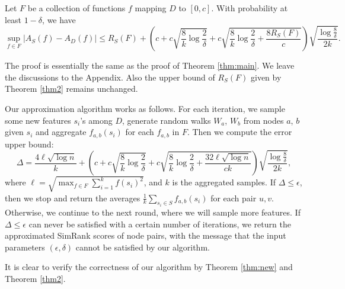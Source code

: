 \documentclass{article}
\begin{document}
\begin{theorem}
\label{thm:new}
Let $F$ be a collection of functions $f$ mapping $D$ to $[0,c]$. 
With probability at least $1-\delta$, we have
$$\sup_{f\in F}|A_S(f) - A_D(f)| \leq R_S(F) + \left(c+c\sqrt{\frac{8}{k}\log \frac{2}{\delta}} + c\sqrt{\frac{8}{k}\log \frac{2}{\delta} + \frac{8R_S(F)}{c}}\right)\sqrt{\frac{\log \frac{8}{\delta}}{2k}}.$$
\end{theorem}
The proof is essentially the same as the proof of Theorem \ref{thm:main}. We leave the discussions to the Appendix. Also the upper bound of $R_S(F)$ given by Theorem \ref{thm2} remains unchanged.

Our approximation algorithm works as follows. For each iteration, we sample some new features $s_i$'s among $D$, generate random walks $W_a$, $W_b$ from nodes $a$, $b$ given $s_i$ and aggregate $f_{a,b}(s_i)$ for each $f_{a,b}$ in $F$. Then we compute the error upper bound:
$$\Delta = \frac{4\ell\sqrt{\log n}}{k} +\left(c+c\sqrt{\frac{8}{k}\log \frac{2}{\delta}} + c\sqrt{\frac{8}{k}\log \frac{2}{\delta} + \frac{32\ell\sqrt{\log n}}{ck}}\right)\sqrt{\frac{\log \frac{8}{\delta}}{2k}},$$
where $\ell = \sqrt{\max_{f\in F} \sum_{i=1}^k f(s_i)^2}$, and $k$ is the aggregated samples. 
If $\Delta \leq \epsilon$, then we stop and return the averages $\frac{1}{k}\sum_{s_i\in S}f_{a,b}(s_i)$ for each pair $u, v$. Otherwise, we continue to the next round, where we will sample more features. If $\Delta \leq \epsilon$ can never be satisfied with a certain number of iterations, we return the approximated SimRank scores of node pairs, with the message that the input parameters $(\epsilon,\delta)$ cannot be satisfied by our algorithm.

It is clear to verify the correctness of our algorithm by Theorem \ref{thm:new} and Theorem \ref{thm2}.
\end{document}
